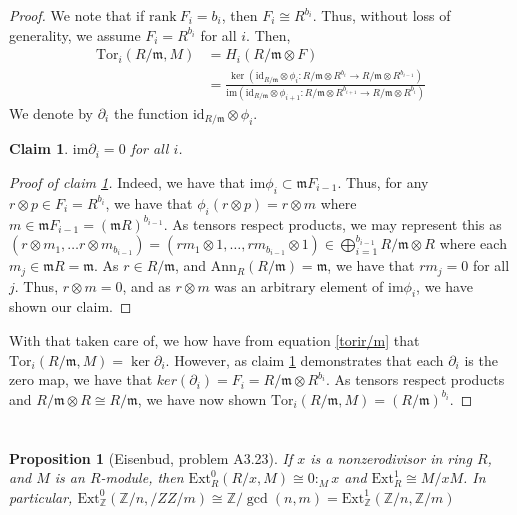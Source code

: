 \documentclass[english]{article}
\newcommand{\ZZ}{\mathbb{Z}}
\newcommand{\mfr}{\mathfrak{m}}
\newenvironment{subproof}[1][\proofname]{%
	\renewcommand{\qedsymbol}{$\blacksquare$}%
	\begin{proof}[#1]%
	}{%
	\end{proof}%
}
\newcommand{\prob}[1]{\setcounter{section}{#1-1}\section{}}
\newtheorem*{prop*}{Proposition}
\newtheorem{claim}[theorem]{Claim}
\theoremstyle{remark}
\theoremstyle{definition}
\newcommand{\id}{\mathrm{id}}
\newcommand{\im}{\mathrm{im}}
\newcommand{\tor}{\mathrm{Tor}}
\newcommand{\ext}{\mathrm{Ext}}
\newcommand{\col}[3]{{#1}:_{#2}{#3}}
\newcommand{\rank}{\mathrm{rank}~}
\newcommand{\del}{\partial}
\newcommand{\ann}{\mathrm{Ann}}
\begin{document}
\begin{proof}
	We note that if $\rank F_i=b_i$, then $F_i\cong R^{b_i}$. Thus, without loss of generality, we assume $F_i=R^{b_i}$ for all $i$. Then, \begin{align}\tor_i(R/\mfr,M)&=H_i(R/\mfr\otimes F)\nonumber\\
	&=\frac{\ker\left(\id_{R/\mfr}\otimes \phi_i:R/\mfr\otimes R^{b_i}\to R/\mfr \otimes R^{b_{i-1}}\right)}{\im\left(\id_{R/\mfr}\otimes \phi_{i+1}:R/\mfr\otimes R^{b_{i+1}}\to R/\mfr \otimes R^{b_i}\right)}\label{torir/m}\end{align}
	We denote by $\del_i$ the function $\id_{R/\mfr}\otimes \phi_i$. 
	\begin{claim}\label{claima318} $\im \del_i=0$ for all $i$.\end{claim}\begin{subproof}[Proof of claim \ref{claima318}] Indeed, we have that $\im \phi_i\subset \mfr F_{i-1}$. Thus, for any $r\otimes p\in F_i=R^{b_i}$, we have that $\phi_i(r\otimes p)=r\otimes m$ where $m\in \mfr F_{i-1}=(\mfr R)^{b_{i-1}}$. As tensors respect products, we may represent this as $(r\otimes m_1,\hdots r\otimes m_{b_{i-1}})=(rm_1\otimes 1,\hdots,rm_{b_{i-1}}\otimes 1)\in \bigoplus_{i=1}^{b_{i-1}}R/\mfr \otimes R$ where each $m_j\in \mfr R=\mfr$. As $r\in R/\mfr$, and $\ann_R(R/\mfr)=\mfr$, we have that $rm_j=0$ for all $j$. Thus, $r\otimes m=0$, and as $r\otimes m$ was an arbitrary element of $\im\phi_i$, we have shown our claim.\end{subproof}
	With that taken care of, we how have from equation \eqref{torir/m} that $\tor_i(R/\mfr,M)=\ker\del_i$. However, as claim \ref{claima318} demonstrates that each $\del_i$ is the zero map, we have that $ker(\del_i)=F_i=R/\mfr\otimes R^{b_i}$. As tensors respect products and $R/\mfr\otimes R\cong R/\mfr$, we have now shown $\tor_i(R/\mfr,M)=(R/\mfr)^{b_i}$.  
\end{proof}
%
%
%
\prob{33}\begin{prop*}[Eisenbud, problem A3.23]
	If $x$ is a nonzerodivisor in ring $R$, and $M$ is an $R$-module, then $\ext_R^0(R/x,M)\cong\col{0}{M}{x}$ and $\ext_R^1\cong M/xM$. In particular, $\ext^0_\ZZ(\ZZ/n,/ZZ/m)\cong \ZZ/\gcd(n,m)=\ext^1_\ZZ(\ZZ/n,\ZZ/m)$
\end{prop*}
\end{document}
